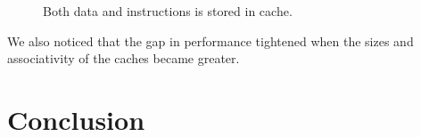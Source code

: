 \documentclass[titlepage, a4paper]{article}
\begin{document}
\begin{figure}[H]
	\centering
	\caption{Both data and instructions is stored in cache.}
	\label{fig:unified-cache}
\end{figure}

We also noticed that the gap in performance tightened when the sizes and associativity of the caches became greater.

\section{Conclusion}
\end{document}
